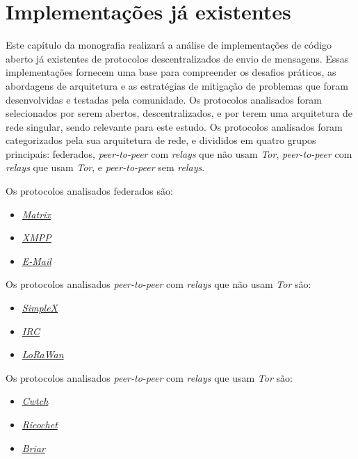 
\chapter{Implementações já existentes}

Este capítulo da monografia realizará a análise de implementações de código aberto já existentes de protocolos descentralizados de envio de mensagens. Essas implementações fornecem uma base para compreender os desafios práticos, as abordagens de arquitetura e as estratégias de mitigação de problemas que foram desenvolvidas e testadas pela comunidade. Os protocolos analisados foram selecionados por serem abertos, descentralizados, e por terem uma arquitetura de rede singular, sendo relevante para este estudo. Os protocolos analisados foram categorizados pela sua arquitetura de rede, e divididos em quatro grupos principais: federados, \textit{peer-to-peer} com \textit{relays} que não usam \textit{Tor}, \textit{peer-to-peer} com \textit{relays} que usam \textit{Tor}, e \textit{peer-to-peer} sem \textit{relays}.

Os protocolos analisados federados são:
\begin{itemize}
  \item \href{https://matrix.org/}{\textit{Matrix}}
  \item \href{https://xmpp.org/}{\textit{XMPP}}
  \item \href{https://datatracker.ietf.org/doc/html/rfc5321}{\textit{E-Mail}}
\end{itemize}

Os protocolos analisados \textit{peer-to-peer} com \textit{relays} que não usam \textit{Tor} são:
\begin{itemize}
  \item \href{https://simplex.chat/}{\textit{SimpleX}}
  \item \href{https://datatracker.ietf.org/doc/html/rfc2810}{\textit{IRC}}
  \item \href{https://lora-alliance.org/}{\textit{LoRaWan}}
\end{itemize}

Os protocolos analisados \textit{peer-to-peer} com \textit{relays} que usam \textit{Tor} são:
\begin{itemize}
  \item \href{https://cwtch.im/}{\textit{Cwtch}}
  \item \href{https://ricochet.im/}{\textit{Ricochet}}
  \item \href{https://briarproject.org/}{\textit{Briar}}
\end{itemize}

